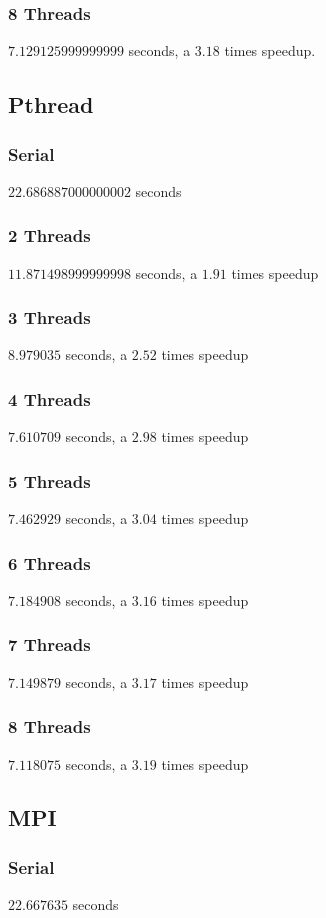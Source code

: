 \documentclass{article}
\begin{document}
\subsubsection*{8 Threads}
$7.129125999999999$ seconds, a $3.18$ times speedup.
\subsection*{Pthread}
\subsubsection*{Serial}
$22.686887000000002$ seconds
\subsubsection*{2 Threads}
$11.871498999999998$ seconds, a $1.91$ times speedup
\subsubsection*{3 Threads}
$8.979035$ seconds, a $2.52$ times speedup
\subsubsection*{4 Threads}
$7.610709$ seconds, a $2.98$ times speedup
\subsubsection*{5 Threads}
$7.462929$ seconds, a $3.04$ times speedup
\subsubsection*{6 Threads}
$7.184908$ seconds, a $3.16$ times speedup
\subsubsection*{7 Threads}
$7.149879$ seconds, a $3.17$ times speedup
\subsubsection*{8 Threads}
$7.118075$ seconds, a $3.19$ times speedup
\subsection*{MPI}
\subsubsection*{Serial}
$22.667635$ seconds
\end{document}
